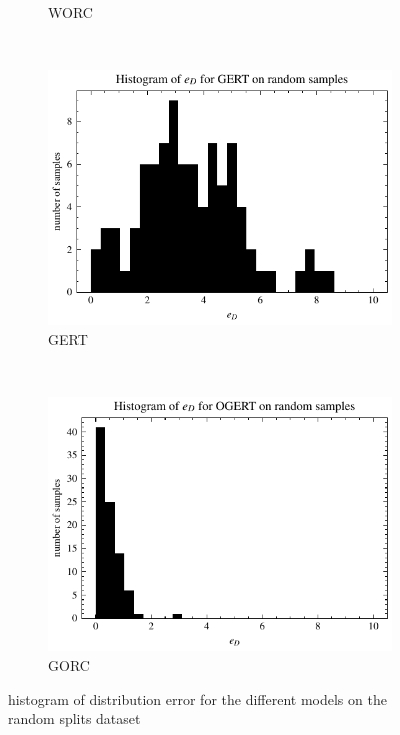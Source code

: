 \begin{figure}[ht]
\begin{subfigure}[t]{0.5\textwidth}
        \captionsetup{width=.9\linewidth}
        \caption{WORC}
    \end{subfigure}
    \\[1ex]
    \centering
    \begin{subfigure}[t]{0.5\textwidth}
        \centering
        \includegraphics[width=\textwidth]{chapters/figures/result_histograms/result_histogram_random_sample_workload_dist_error_GERT.pdf}
        \captionsetup{width=.9\linewidth}
        \caption{GERT}
    \end{subfigure}%
    ~ 
    \begin{subfigure}[t]{0.5\textwidth}
        \centering
        \includegraphics[width=\textwidth]{chapters/figures/result_histograms/result_histogram_random_sample_workload_dist_error_OGERT.pdf}
        \captionsetup{width=.9\linewidth}
        \caption{GORC}
    \end{subfigure}
    \caption{histogram of distribution error for the different models on the random splits dataset}
    \label{fig:result_random_sample_dist}
\end{figure}
